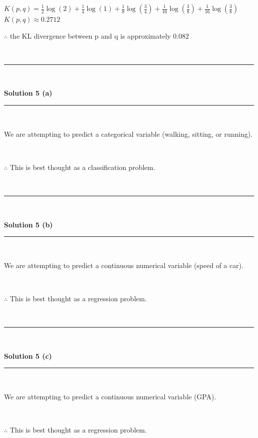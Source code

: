 \documentclass{article}
\begin{document}
$K(p,q) = \frac{1}{2} \log(2) + \frac{1}{4} \log(1) + \frac{1}{8} \log\left(\frac{3}{4}\right) + \frac{1}{16} \log\left(\frac{3}{8}\right) + \frac{1}{16} \log\left(\frac{3}{8}\right)$\\

$K(p,q) \approx 0.2712$\\

\parbox{\textwidth}{$\therefore$ the KL divergence between p and q is approximately $0.082$ }\\

\noindent\rule{\textwidth}{0.4pt}\\

\newpage

\textbf{Solution 5 (a)}

\noindent\rule{\textwidth}{0.4pt}\\

\parbox{\textwidth}{We are attempting to predict a categorical variable (walking, sitting, or running).}\\

\parbox{\textwidth}{$\therefore$ This is best thought as a classification problem.}\\

\noindent\rule{\textwidth}{0.4pt}\\

\newpage

\textbf{Solution 5 (b)}

\noindent\rule{\textwidth}{0.4pt}\\

\parbox{\textwidth}{We are attempting to predict a continuous numerical variable (speed of a car).}\\

\parbox{\textwidth}{$\therefore$ This is best thought as a regression problem.}\\

\noindent\rule{\textwidth}{0.4pt}\\

\newpage

\textbf{Solution 5 (c)}

\noindent\rule{\textwidth}{0.4pt}\\

\parbox{\textwidth}{We are attempting to predict a continuous numerical variable (GPA).}\\

\parbox{\textwidth}{$\therefore$ This is best thought as a regression problem.}\\
\end{document}
